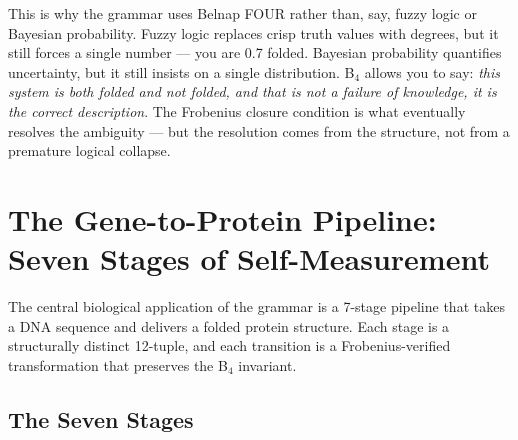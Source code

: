\documentclass[11pt,a4paper,twocolumn]{article}
\begin{document}
This is why the grammar uses Belnap FOUR rather than, say, fuzzy logic or Bayesian probability. Fuzzy logic replaces crisp truth values with degrees, but it still forces a single number — you are 0.7 folded. Bayesian probability quantifies uncertainty, but it still insists on a single distribution. B$_4$ allows you to say: \emph{this system is both folded and not folded, and that is not a failure of knowledge, it is the correct description}. The Frobenius closure condition is what eventually resolves the ambiguity — but the resolution comes from the structure, not from a premature logical collapse.


\section{The Gene-to-Protein Pipeline: Seven Stages of Self-Measurement}

The central biological application of the grammar is a 7-stage pipeline that takes a DNA sequence and delivers a folded protein structure. Each stage is a structurally distinct 12-tuple, and each transition is a Frobenius-verified transformation that preserves the B$_4$ invariant.

\subsection{The Seven Stages}
\end{document}
